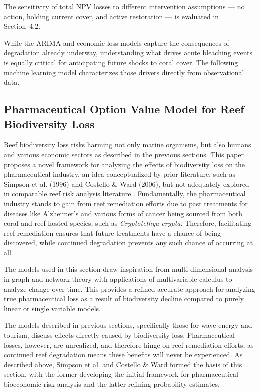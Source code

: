 \documentclass[10pt,letterpaper]{article}
\newcounter{assumption}
\begin{document}
The sensitivity of total NPV losses to different intervention assumptions --- no action, holding current cover, and active restoration --- is evaluated in Section~4.2.

While the ARIMA and economic loss models capture the consequences of degradation already underway, understanding what drives acute bleaching events is equally critical for anticipating future shocks to coral cover. The following machine learning model characterizes those drivers directly from observational data.

\subsection{Pharmaceutical Option Value Model for Reef Biodiversity Loss}

Reef biodiversity loss risks harming not only marine organisms, but also humans and various economic sectors as described in the previous sections. This paper proposes a novel framework for analyzing the effects of biodiversity loss on the pharmaceutical industry, an idea conceptualized by prior literature, such as Simpson et al. (1996) and Costello \& Ward (2006), but not adequately explored in comparable reef risk analysis literature \cite{simpson1996, costello2006}. Fundamentally, the pharmaceutical industry stands to gain from reef remediation efforts due to past treatments for diseases like Alzheimer's and various forms of cancer being sourced from both coral and reef-hosted species, such as \textit{Cryptotethya crypta}. Therefore, facilitating reef remediation ensures that future treatments have a chance of being discovered, while continued degradation prevents any such chance of occurring at all.


The models used in this section draw inspiration from multi-dimensional analysis in graph and network theory with applications of multivariable calculus to analyze change over time. This provides a refined accurate approach for analyzing true pharmaceutical loss as a result of biodiversity decline compared to purely linear or single variable models.

The models described in previous sections, specifically those for wave energy and tourism, discuss effects directly caused by biodiversity loss. Pharmaceutical losses, however, are unrealized, and therefore hinge on reef remediation efforts, as continued reef degradation means these benefits will never be experienced. As described above, Simpson et al. and Costello \& Ward formed the basis of this section, with the former developing the initial framework for pharmaceutical bioeconomic risk analysis and the latter refining probability estimates.
\end{document}
